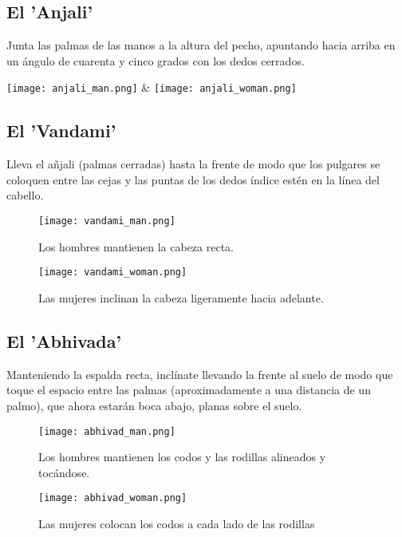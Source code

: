 \subsection{El 'Anjali'}

Junta las palmas de las manos a la altura del pecho, apuntando hacia arriba en un ángulo de cuarenta y cinco grados con los dedos cerrados.
\begin{twochants}
	\texttt{[image: anjali\_man.png]} & \texttt{[image: anjali\_woman.png]}
\end{twochants}	

\flushleft
\subsection{El 'Vandami'}

Lleva el añjali (palmas cerradas) hasta la frente de modo que los pulgares se coloquen entre las cejas y las puntas de los dedos índice estén en la línea del cabello.

\begin{figure}[h]
	\centering
	
	\begin{minipage}{0.49\textwidth}
		\centering
		\texttt{[image: vandami\_man.png]}
		\caption{Los hombres mantienen la cabeza recta.}
	\end{minipage}
	\hfill
	\begin{minipage}{0.49\textwidth}
		\centering
		\texttt{[image: vandami\_woman.png]}
		\caption{Las mujeres inclinan la cabeza ligeramente hacia adelante.}
	\end{minipage}
	
\end{figure}

\enlargethispage{2\baselineskip}

\subsection{El 'Abhivada'}

Manteniendo la espalda recta, inclínate llevando la frente al suelo de modo que toque el espacio entre las palmas (aproximadamente a una distancia de un palmo), que ahora estarán boca abajo, planas sobre el suelo.

\begin{figure}[h]
	\centering
	
	\begin{minipage}{0.49\textwidth}
		\centering
		\texttt{[image: abhivad\_man.png]}
		\caption{Los hombres mantienen los codos y las rodillas alineados y tocándose.}
	\end{minipage}
	\hfill
	\begin{minipage}{0.49\textwidth}
		\centering
		\texttt{[image: abhivad\_woman.png]}
		\caption{Las mujeres colocan los codos a cada lado de las rodillas}
	\end{minipage}
	
\end{figure}




